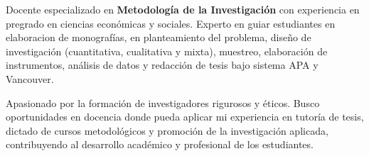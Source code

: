 \par{
	

	Docente especializado en \textbf{Metodología de la Investigación} con experiencia en pregrado en ciencias económicas y sociales. Experto en guiar estudiantes en elaboracion de monografías, en planteamiento del problema, diseño de investigación (cuantitativa, cualitativa y mixta), muestreo, elaboración de instrumentos, análisis de datos y redacción de tesis bajo sistema APA y Vancouver.
		
	Apasionado por la formación de investigadores rigurosos y éticos. Busco oportunidades en docencia donde pueda aplicar mi experiencia en tutoría de tesis, dictado de cursos metodológicos y promoción de la investigación aplicada, contribuyendo al desarrollo académico y profesional de los estudiantes.

	 
	


}
